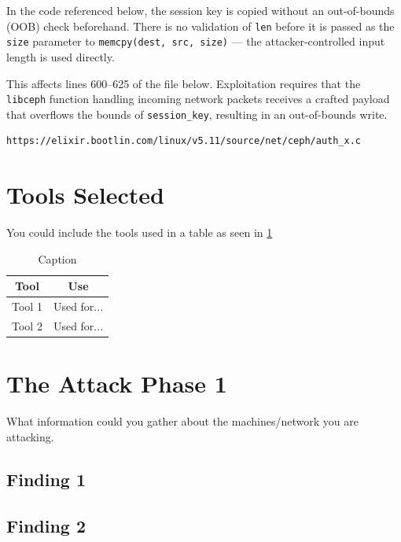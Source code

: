 \documentclass[letterpaper,12pt]{article}
\begin{document}
In the code referenced below, the session key is copied without an
out-of-bounds (OOB) check beforehand. There is no validation of \texttt{len}
before it is passed as the \texttt{size} parameter to
\texttt{memcpy(dest, src, size)} --- the attacker-controlled input length is
used directly.

This affects lines 600--625 of the file below. Exploitation requires that the
\texttt{libceph} function handling incoming network packets receives a
crafted payload that overflows the bounds of \texttt{session\_key}, resulting
in an out-of-bounds write.

\begin{verbatim}
https://elixir.bootlin.com/linux/v5.11/source/net/ceph/auth_x.c
\end{verbatim}









\section{Tools Selected}

You could include the tools used in a table as seen in \ref{tab:my_tools}
\begin{table}[h]
    \centering
    \begin{tabular}{|c|c|}\hline
        Tool & Use \\ \hline
         Tool 1 & Used for...\\
         Tool 2 & Used for...\\ \hline
    \end{tabular}
    \caption{Caption}
    \label{tab:my_tools}
\end{table}



\section{The Attack Phase 1}

What information could you gather about the machines/network you are attacking.

\subsection{Finding 1}
\subsection {Finding 2}
\end{document}
